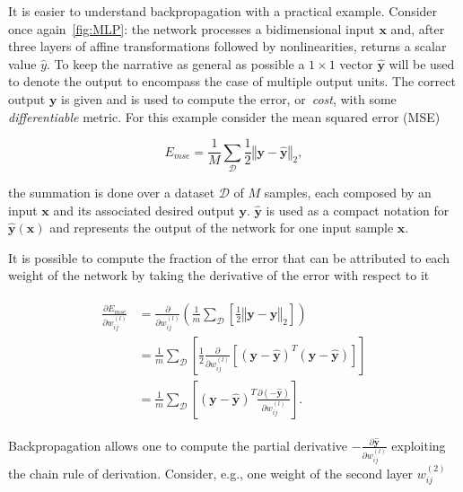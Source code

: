 It is easier to understand backpropagation with a practical example. Consider
once again~\autoref{fig:MLP}: the network processes a bidimensional input
$\mathbf{x}$ and, after three layers of affine transformations followed by
nonlinearities, returns a scalar value $\hat y$. To keep the narrative as
general as possible a $1 \times 1$ vector $\mathbf{\hat y}$ will be used to
denote the output to encompass the case of multiple output units. The correct
output $\mathbf{y}$ is given and is used to compute the error, or~\emph{cost},
with some \emph{differentiable} metric. For this example consider the mean
squared error (MSE)

\begin{equation}\label{eq:MSE}
    E_{mse} = \frac{1}{M} \sum_{\mathcal{D}}
        \frac{1}{2}\left\Vert\mathbf{y} - \mathbf{\hat y}\right\Vert_2,
\end{equation}

\noindent the summation is done over a dataset $\mathcal{D}$ of $M$ samples,
each composed by an input $\mathbf{x}$ and its associated desired output
$\mathbf{y}$. $\mathbf{\hat y}$ is used as a compact notation for
$\mathbf{\hat y(x)}$ and represents the output of the network for one input sample
$\mathbf{x}$.

It is possible to compute the fraction of the error that can be attributed to
each weight of the network by taking the derivative of the error with respect
to it

\begin{align}\label{eq:backprop_step1}
\begin{split}
    \frac{\partial E_{mse}}{\partial w_{ij}^{(l)}} &=
        \frac{\partial}{\partial w_{ij}^{(l)}}
        \left(\frac{1}{m}\sum_{\mathcal{D}}
        \left[\frac{1}{2}\left\Vert\mathbf{y} - \mathbf{\hat y}\right\Vert_2
        \right]\right) \\
    &= \frac{1}{m}\sum_{\mathcal{D}} \left[\frac{1}{2}
        \frac{\partial}{\partial w_{ij}^{(l)}}\left[
         \left(\mathbf{y} - \mathbf{\hat y}\right)^T
         \left(\mathbf{y} - \mathbf{\hat y}\right)\right]\right] \\
    &= \frac{1}{m}\sum_{\mathcal{D}}\left[(\mathbf{y} - \mathbf{\hat y})^T
        \frac{\partial(-\mathbf{\hat y})}{\partial w_{ij}^{(l)}}
        \right].
\end{split}
\end{align}

Backpropagation allows one to compute the partial derivative
$-\frac{\partial\mathbf{\hat y}}{\partial w_{ij}^{(l)}}$
exploiting the chain rule of derivation. Consider, e.g., one weight of the
second layer $w_{ij}^{(2)}$

